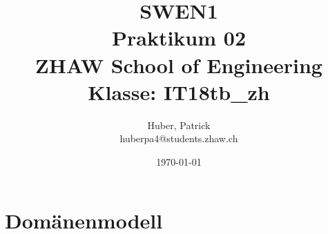 \documentclass[11pt,ngerman]{article}
\begin{document}
    \title{SWEN1\\Praktikum 02\\
        \vspace{1cm}
        \small{ZHAW  School of Engineering\\Klasse: IT18tb\_zh}
        \vspace{1.5cm}
    }
    \author{
        Huber, Patrick\\
        \small{huberpa4@students.zhaw.ch}
        \vspace{1.5cm}
    }
   \date{\today}

    \maketitle
    \newpage

    \tableofcontents
    \listoffigures
    \newpage

    \section{Domänenmodell}
\end{document}
